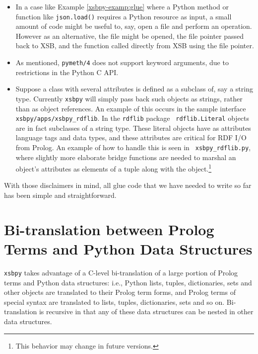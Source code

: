 \begin{itemize}
\item In a case like Example \ref{xsbpy-examp:glue} where a Python
  method or function like {\tt json.load()} requires a Python resource
  as input, a small amount of code might be useful to, say, open a
  file and perform an operation.  However as an alternative, the file
  might be opened, the file pointer passed back to XSB, and the
  function called directly from XSB using the file pointer.

  \item As mentioned, {\tt pymeth/4} does not support keyword
    arguments, due to restrictions in the Python C API.

  \item Suppose a class with several attributes is defined as a
    subclass of, say a string type.  Currently {\tt xsbpy} will simply
    pass back such objects as strings, rather than as object
    references.  An example of this occurs in the sample interface
    {\tt xsbpy/apps/xsbpy\_rdflib}.  In the {\tt rdflib} package {\tt
      rdflib.Literal} objects are in fact subclasses of a string type.
    These literal objects have as attributes language tags and data
    types, and these attributes are critical for RDF I/O from Prolog.
    An example of how to handle this is seen in {\tt
      xsbpy\_rdflib.py}, where slightly more elaborate bridge
    functions are needed to marshal an object's attributes as elements
    of a tuple along with the object.\footnote{This behavior may
      change in future versions.}
\end{itemize}

With those disclaimers in mind, all glue code that we have needed to
write so far has been simple and straightforward.

\section{Bi-translation between Prolog Terms and Python Data Structures} \label{sec:bi-translation}

{\tt xsbpy} takes advantage of a C-level bi-translation of a large
portion of Prolog terms and Python data structures: i.e., Python
lists, tuples, dictionaries, sets and other objects are translated to
their Prolog term forms, and Prolog terms of special syntax are
translated to lists, tuples, dictionaries, sets and so on.
Bi-translation is recursive in that any of these data structures can
be nested in other data structures.
     
